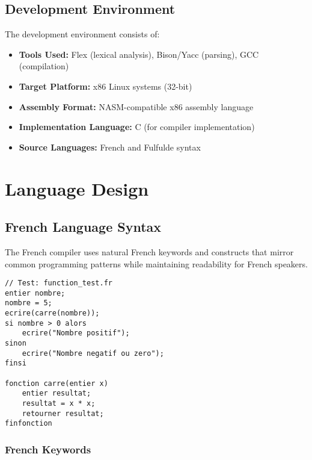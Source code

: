 \documentclass[12pt,a4paper]{article}
\begin{document}
\subsection{Development Environment}

The development environment consists of:

\begin{itemize}
    \item \textbf{Tools Used:} Flex (lexical analysis), Bison/Yacc (parsing), GCC (compilation)
    \item \textbf{Target Platform:} x86 Linux systems (32-bit)
    \item \textbf{Assembly Format:} NASM-compatible x86 assembly language
    \item \textbf{Implementation Language:} C (for compiler implementation)
    \item \textbf{Source Languages:} French and Fulfulde syntax
\end{itemize}

\section{Language Design}

\subsection{French Language Syntax}

The French compiler uses natural French keywords and constructs that mirror common programming patterns while maintaining readability for French speakers.

\begin{lstlisting}[language=French, caption={Example French Program}, label={lst:french-example}]
// Test: function_test.fr
entier nombre;
nombre = 5;
ecrire(carre(nombre));
si nombre > 0 alors
    ecrire("Nombre positif");
sinon
    ecrire("Nombre negatif ou zero");
finsi

fonction carre(entier x)
    entier resultat;
    resultat = x * x;
    retourner resultat;
finfonction

\end{lstlisting}

\subsubsection{French Keywords}
\end{document}
